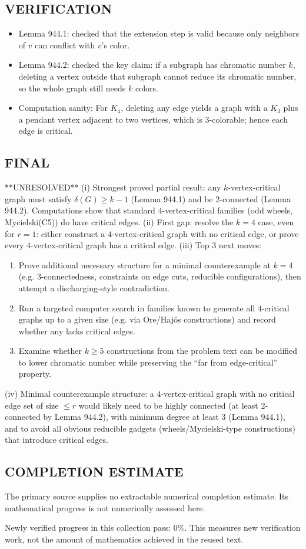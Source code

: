 \subsection*{VERIFICATION}
\begin{itemize}
\item Lemma 944.1: checked that the extension step is valid because only neighbors of $v$ can conflict with $v$'s color.
\item Lemma 944.2: checked the key claim: if a subgraph has chromatic number $k$, deleting a vertex outside that subgraph cannot reduce its chromatic number, so the whole graph still needs $k$ colors.
\item Computation sanity: For $K_4$, deleting any edge yields a graph with a $K_3$ plus a pendant vertex adjacent to two vertices, which is 3-colorable; hence each edge is critical.
\end{itemize}

\subsection*{FINAL}
**UNRESOLVED**
(i) Strongest proved partial result: any $k$-vertex-critical graph must satisfy $\delta(G)\ge k-1$ (Lemma 944.1) and be 2-connected (Lemma 944.2). Computations show that standard $4$-vertex-critical families (odd wheels, Mycielski(C5)) do have critical edges.
(ii) First gap: resolve the $k=4$ case, even for $r=1$: either construct a $4$-vertex-critical graph with no critical edge, or prove every $4$-vertex-critical graph has a critical edge.
(iii) Top 3 next moves:
\begin{enumerate}
\item Prove additional necessary structure for a minimal counterexample at $k=4$ (e.g. 3-connectedness, constraints on edge cuts, reducible configurations), then attempt a discharging-style contradiction.
\item Run a targeted computer search in families known to generate all $4$-critical graphs up to a given size (e.g. via Ore/Haj\'{o}s constructions) and record whether any lacks critical edges.
\item Examine whether $k\ge 5$ constructions from the problem text can be modified to lower chromatic number while preserving the ``far from edge-critical'' property.
\end{enumerate}
(iv) Minimal counterexample structure: a $4$-vertex-critical graph with no critical edge set of size $\le r$ would likely need to be highly connected (at least 2-connected by Lemma 944.2), with minimum degree at least 3 (Lemma 944.1), and to avoid all obvious reducible gadgets (wheels/Mycielski-type constructions) that introduce critical edges.




\subsection*{COMPLETION ESTIMATE}
The primary source supplies no extractable numerical completion estimate. Its mathematical progress is not numerically assessed here.

Newly verified progress in this collection pass: $0\%$. This measures new verification work, not the amount of mathematics achieved in the reused text.
